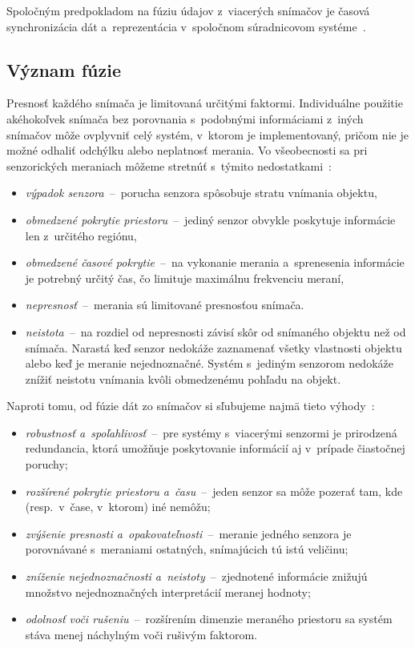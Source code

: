     Spoločným predpokladom na fúziu údajov z~viacerých snímačov je časová synchronizácia dát a~reprezentácia v~spoločnom súradnicovom systéme~\cite{laganiereSensorFusionAutonomous2021}.

  \subsection{Význam fúzie}
      
      Presnosť každého snímača je limitovaná určitými faktormi. Individuálne použitie akéhokoľvek snímača bez porovnania s~podobnými informáciami z~iných snímačov môže ovplyvniť celý systém, v~ktorom je implementovaný, pričom nie je možné odhaliť odchýlku alebo neplatnosť merania. Vo všeobecnosti sa pri senzorických meraniach môžeme stretnúť s~týmito nedostatkami~\cite{elmenreichIntroductionSensorFusion}:
      \begin{itemize}
          \item \emph{výpadok senzora}~--~porucha senzora spôsobuje stratu vnímania objektu,
          \item \emph{obmedzené pokrytie priestoru}~--~jediný senzor obvykle poskytuje informácie len z~určitého regiónu,
          \item \emph{obmedzené časové pokrytie}~--~na vykonanie merania a~sprenesenia informácie je potrebný určitý čas, čo limituje maximálnu frekvenciu meraní,
          \item \emph{nepresnosť}~--~merania sú limitované presnosťou snímača.
          \item \emph{neistota}~--~na rozdiel od nepresnosti závisí skôr od snímaného objektu než od snímača. Narastá keď senzor nedokáže zaznamenať všetky vlastnosti objektu alebo keď je meranie nejednoznačné. Systém s~jediným senzorom nedokáže znížiť neistotu vnímania kvôli obmedzenému pohľadu na objekt.
      \end{itemize}
          
      Naproti tomu, od fúzie dát zo snímačov si sľubujeme najmä tieto výhody~\cite{elmenreichIntroductionSensorFusion}:
      \begin{itemize}
          \item \emph{robustnosť a~spoľahlivosť}~--~pre systémy s~viacerými senzormi je prirodzená redundancia, ktorá umožňuje poskytovanie informácií aj v~prípade čiastočnej poruchy;
          \item \emph{rozšírené pokrytie priestoru a~času}~--~jeden senzor sa môže pozerať tam, kde (resp.\ v~čase, v~ktorom) iné nemôžu;
          \item \emph{zvýšenie presnosti a~opakovateľnosti}~--~meranie jedného senzora je porovnávané s~meraniami ostatných, snímajúcich tú istú veličinu;
          \item \emph{zníženie nejednoznačnosti a~neistoty}~--~zjednotené informácie znižujú množstvo nejednoznačných interpretácií meranej hodnoty;
          \item \emph{odolnosť voči rušeniu}~--~rozšírením dimenzie meraného priestoru sa systém stáva menej náchylným voči rušivým faktorom.
      \end{itemize}
          
